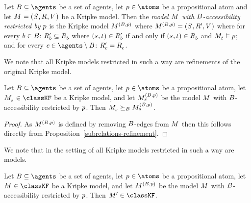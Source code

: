 \begin{definition}
Let $\agentsB \subseteq \agents$ be a set of agents, let $\atomP \in \atoms$ be a propositional atom and let $\kModelAndTuple$ be a Kripke model.
Then the {\em model $\kModel$ with $\agentsB$-accessibility restricted by $\atomP$} is the Kripke model $\kModel[(\agentsB, \atomP)]$ where $\kModel[(\agentsB, \atomP)] = (\kStates, \kAccessibilityP{}, \kValuation)$ where for every $\agentB \in \agentsB$: $\kAccessibilityPB \subseteq \kAccessibilityB$ where $(\kStateS, \kStateT) \in \kAccessibilityPB$ if and only if $(\kStateS, \kStateT) \in \kAccessibilityB$ and $\kPModel{\kStateT} \entails \atomP$; and for every $\agentC \in \agents \setminus \agentsB$: $\kAccessibilityPC = \kAccessibilityC$.
\end{definition}

We note that all Kripke models restricted in such a way are refinements of the original Kripke model.

\begin{lemma}\label{rml-k4-restriction-refinement}
Let $\agentsB \subseteq \agents$ be a set of agents, let $\atomP \in \atoms$ be a propositional atom, let $\kPModel{\kStateS} \in \classKF$ be a Kripke model, and let $\kPModel[(\agentsB, \atomP)]{\kStateS}$ be the model $\kModel$ with $\agentsB$-accessibility restricted by $\atomP$.
Then $\kPModel{\kStateS} \simulatesBs \kPModel[(\agentsB, \atomP)]{\kStateS}$.
\end{lemma}

\begin{proof}
As $\kModel[(\agentsB, \atomP)]$ is defined by removing $\agentsB$-edges from $\kModel$ then this follows directly from Proposition~\ref{subrelations-refinement}.
\end{proof}

We note that in the setting of \classKF{} all Kripke models restricted in such a way are \classKF{} models.

\begin{lemma}\label{rml-k4-restriction-k4}
Let $\agentsB \subseteq \agents$ be a set of agents, let $\atomP \in \atoms$ be a propositional atom, let $\kModel \in \classKF$ be a Kripke model, and let $\kModel[(\agentsB, \atomP)]$ be the model $\kModel$ with $\agentsB$-accessibility restricted by $\atomP$.
Then $\kModelP \in \classKF$.
\end{lemma}

